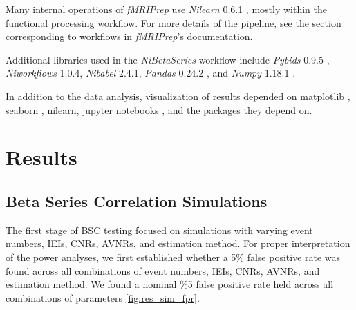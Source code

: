 \documentclass[10pt,letterpaper]{article}
\begin{document}
Many internal operations of \emph{fMRIPrep} use \emph{Nilearn} 0.6.1
\cite[RRID:SCR\_001362]{nilearn}, mostly within the functional
processing workflow. For more details of the pipeline, see
\href{https://fmriprep.readthedocs.io/en/latest/workflows.html}{the
section corresponding to workflows in \emph{fMRIPrep}'s documentation}.

Additional libraries used in the \emph{NiBetaSeries} workflow include
\emph{Pybids} 0.9.5 \cite{Yarkoni2019}, \emph{Niworkflows} 1.0.4,
\emph{Nibabel} 2.4.1, \emph{Pandas} 0.24.2 \cite{McKinney2010}, and
\emph{Numpy} 1.18.1 \cite{VanDerWalt2011, Oliphant2006}.

In addition to the data analysis, visualization of results depended
on matplotlib \cite{Hunter2007}, seaborn \cite{Waskom2020}, nilearn,
jupyter notebooks \cite{Kluyver2016a}, and the packages they depend on.


\section*{Results}
\label{results}

\subsection*{Beta Series Correlation Simulations}
\label{results:bsc-simulations}

The first stage of BSC testing focused on simulations with varying event numbers,
IEIs, CNRs, AVNRs, and estimation method.
For proper interpretation of the power analyses, we first established whether
a 5\% false positive rate was found across all combinations of
event numbers, IEIs, CNRs, AVNRs, and estimation method.
We found a nominal \%5 false positive rate held across all combinations
of parameters \ref{fig:res_sim_fpr}.
\end{document}

